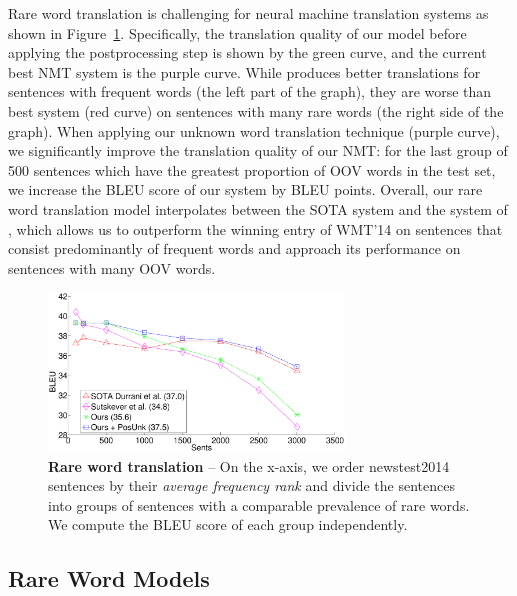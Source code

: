Rare word translation is challenging for neural machine translation systems as
shown in Figure~\ref{f:rare}. Specifically, the translation quality of our
model before applying the postprocessing step is shown by the green curve, and the current
best NMT system \cite{sutskever14} is the purple curve. While \cite{sutskever14}
produces better translations for sentences with frequent words (the left part of the
graph), they are worse than best system (red curve)
on sentences with many rare words (the right side of the graph). When applying our
unknown word translation technique (purple curve), we
significantly improve the translation quality of our NMT: 
for the last group of 500 sentences which have the greatest proportion of 
OOV words in the test set, we increase the BLEU score of our system by 
\imprare{} BLEU points. Overall, our rare word translation model 
interpolates between the SOTA system and the system
of ,  which allows us to outperform the winning entry of WMT'14
on sentences that consist predominantly of frequent words and approach its performance on sentences
with many OOV words.
\begin{figure}
\centering
\includegraphics[width=0.7\textwidth, clip=true, trim= 95 0 230 0]{img/3-rare} %
\caption[Rare word translation]{{\bf Rare word translation} -- 
On the x-axis, we order newstest2014 sentences by their {\it average frequency rank} and divide the sentences into groups 
of sentences with a comparable prevalence of rare words. 
We compute the BLEU score of each group independently.} 
\label{f:rare}
\end{figure}


\subsection{Rare Word Models}
\label{subsec:rare_model_compare}

